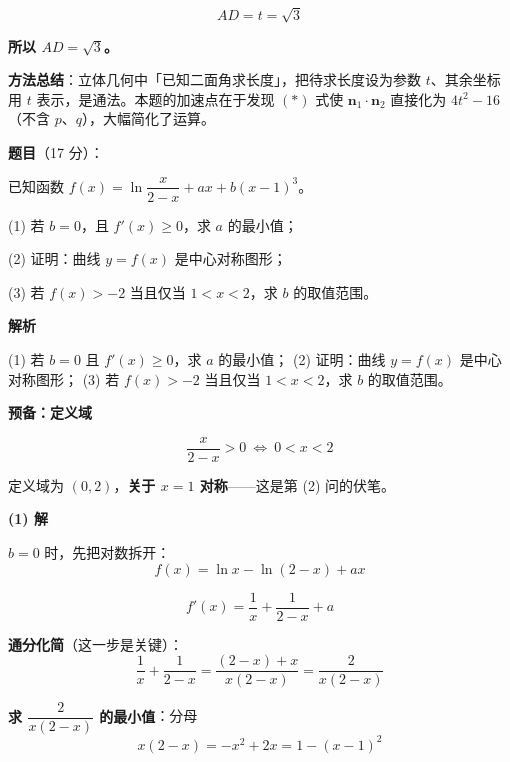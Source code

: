 \begin{answer}
\nopagebreak[4]
\[AD=t=\sqrt3\]

\textbf{所以 $AD=\sqrt3$。}

\begin{gktip}
\textbf{方法总结}：立体几何中「已知二面角求长度」，把待求长度设为参数 $t$、其余坐标用 $t$ 表示，是通法。本题的加速点在于发现 $(\ast)$ 式使 $\boldsymbol n_1\cdot\boldsymbol n_2$ 直接化为 $4t^2-16$（不含 $p$、$q$），大幅简化了运算。
\end{gktip}



\par\medskip

\end{answer}
\begin{answer}

\textbf{题目}（17 分）：

已知函数 $f(x)=\ln\dfrac{x}{2-x}+ax+b(x-1)^{3}$。

  (1) 若 $b=0$，且 $f'(x)\ge0$，求 $a$ 的最小值；

  (2) 证明：曲线 $y=f(x)$ 是中心对称图形；

  (3) 若 $f(x)>-2$ 当且仅当 $1<x<2$，求 $b$ 的取值范围。

\textbf{解析}

  (1) 若 $b=0$ 且 $f'(x)\ge0$，求 $a$ 的最小值；
  (2) 证明：曲线 $y=f(x)$ 是中心对称图形；
  (3) 若 $f(x)>-2$ 当且仅当 $1<x<2$，求 $b$ 的取值范围。

\par\medskip

\textbf{预备：定义域}

\nopagebreak[4]
\[\frac x{2-x}>0\ \Longleftrightarrow\ 0<x<2\]

定义域为 $(0,2)$，\textbf{关于 $x=1$ 对称}——这是第 (2) 问的伏笔。

\par\medskip

\textbf{(1) 解}

$b=0$ 时，先把对数拆开：
\nopagebreak[4]
\[f(x)=\ln x-\ln(2-x)+ax\]

\nopagebreak[4]
\[f'(x)=\frac1x+\frac1{2-x}+a\]

\textbf{通分化简}（这一步是关键）：
\nopagebreak[4]
\[\frac1x+\frac1{2-x}=\frac{(2-x)+x}{x(2-x)}=\frac2{x(2-x)}\]

\textbf{求 $\dfrac2{x(2-x)}$ 的最小值}：分母
\nopagebreak[4]
\[x(2-x)=-x^{2}+2x=1-(x-1)^{2}\]


\end{answer}
